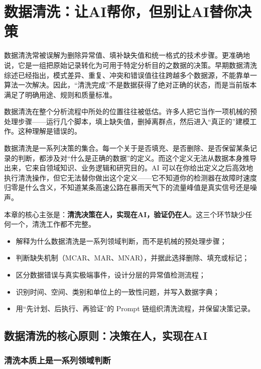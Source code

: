 ﻿\chapter{数据清洗：让AI帮你，但别让AI替你决策}

数据清洗常被误解为删除异常值、填补缺失值和统一格式的技术步骤。更准确地说，它是一组把原始记录转化为可用于特定分析目的之数据的决策。早期数据清洗综述已经指出，模式差异、重复、冲突和错误值往往跨越多个数据源，不能靠单一算法一次解决\cite{rahm2000data}。因此，“清洗完成”不是数据获得了绝对正确的状态，而是当前版本满足了明确用途、规则和质量标准。

数据清洗在整个分析流程中所处的位置往往被低估。许多人把它当作一项机械的预处理步骤——运行几个脚本，填上缺失值，删掉离群点，然后进入“真正的”建模工作。这种理解是错误的。

数据清洗是一系列决策的集合。每一个关于是否填充、是否删除、是否保留某条记录的判断，都涉及对“什么是正确的数据”的定义。而这个定义无法从数据本身推导出来，它来自领域知识、业务逻辑和研究目的。AI 可以在你给出定义之后高效地执行清洗操作，但它无法替你做出这个定义——它不知道你的检测器在故障时速度归零是什么含义，不知道某条高速公路在暴雨天气下的流量峰值是真实信号还是噪声。

本章的核心主张是：\textbf{清洗决策在人，实现在AI，验证仍在人}。这三个环节缺少任何一个，清洗工作都不完整。

\begin{chapterguide}
\begin{itemize}
  \item 解释为什么数据清洗是一系列领域判断，而不是机械的预处理步骤；
  \item 判断缺失机制（MCAR、MAR、MNAR），并据此选择删除、填充或标记；
  \item 区分数据错误与真实极端事件，设计分层的异常值检测流程；
  \item 识别时间、空间、类别和单位上的一致性问题，并写入数据字典；
  \item 用“先计划、后执行、再验证”的 Prompt 链组织清洗流程，并保留决策记录。
\end{itemize}
\end{chapterguide}

\section{数据清洗的核心原则：决策在人，实现在AI}

\subsection{清洗本质上是一系列领域判断}


